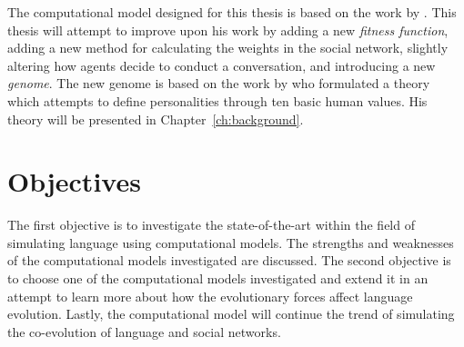 The computational model designed for this thesis is based on the work by \citeauthor{lekvam2014co}. This thesis will attempt to improve upon his work by adding a new \textit{fitness function}, adding a new method for calculating the weights in the social network, slightly altering how agents decide to conduct a conversation, and introducing a new \textit{genome}. The new genome is based on the work by \citeauthor{schwartz1992unniversals} who formulated a theory which attempts to define personalities through ten basic human values. His theory will be presented in Chapter~\ref{ch:background}.

\section{Objectives}
The first objective is to investigate the state-of-the-art within the field of simulating language using computational models. The strengths and weaknesses of the computational models investigated are discussed. The second objective is to choose one of the computational models investigated and extend it in an attempt to learn more about how the evolutionary forces affect language evolution. Lastly, the computational model will continue the trend of simulating the co-evolution of language and social networks.

\begin{comment}
    \section{Research Questions}
    The objectives of this thesis are:
    
    \begin{centering}
        \begin{enumerate}
            \item Investigate the state-of-the-art within the field of simulating language using computational models. The computational models' strengths and weaknesses are discussed.
            \item The computational model presented in \citet{lekvam2014co} will be extended in an attempt to learn more about how the evolutionary forces affect language evolution.
            \item The computational model will continue the trend of simulating the co-evolution of language and social networks.  
        \end{enumerate}
    \end{centering}
\end{comment}


